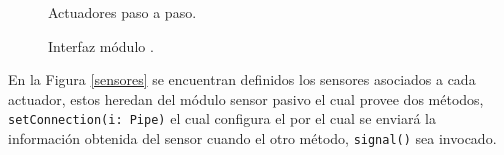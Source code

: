 \begin{figure}[H]
    \begin{minipage}[c]{0.48\textwidth}
        \centering
        \caption{Actuadores paso a paso.}
        \label{estructuraActuadores}
    \end{minipage}
    \hfill %
    \begin{minipage}[c]{0.48\textwidth}
        \centering
        \caption{Interfaz módulo \Pinza.}
        \label{moduloPinza}
    \end{minipage}
\end{figure}

En la Figura \ref{sensores} se encuentran definidos los sensores asociados a cada actuador, estos heredan del módulo sensor pasivo el cual provee dos métodos, \verb|setConnection(i: Pipe)| el cual configura el \Pipe por el cual se enviará la información obtenida del sensor cuando el otro método, \verb|signal()| sea invocado.


